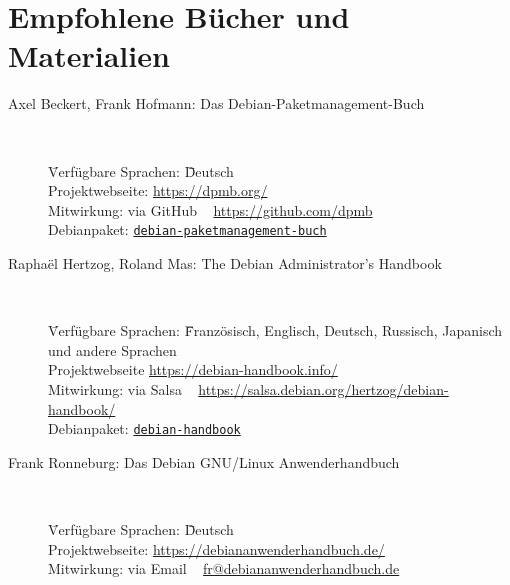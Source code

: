 \documentclass[10pt,a4paper]{article}
\begin{document}
\newpage

\cheatsheet

\section{Empfohlene Bücher und Materialien}

\begin{description}
    \item[Axel Beckert, Frank Hofmann: Das Debian-Paketmanagement-Buch] ~ \\
        \begin{tabbing}
            \= Verfügbare Sprachen: \= \= Deutsch \\
            \> Projektwebseite: \> \> \href{https://dpmb.org/}{https://dpmb.org/} \\
            \> Mitwirkung: \> \> via GitHub ~  \href{https://github.com/dpmb}{https://github.com/dpmb} \\
            \> Debianpaket: \> \> \href{https://packages.debian.org/stable/debian-paketmanagement-buch}{\texttt{debian-paketmanagement-buch}} \\ 
        \end{tabbing}

    \item[Raphaël Hertzog, Roland Mas: The Debian Administrator's Handbook] ~ \\ 
        \begin{tabbing}
            \= Verfügbare Sprachen: \= \= Französisch, Englisch, Deutsch, Russisch, Japanisch und andere Sprachen \\
            \> Projektwebseite \> \> \href{https://debian-handbook.info/}{https://debian-handbook.info/} \\
            \> Mitwirkung: \> \> via Salsa ~ \href{https://salsa.debian.org/hertzog/debian-handbook/}{https://salsa.debian.org/hertzog/debian-handbook/} \\
            \> Debianpaket: \> \> \href{https://packages.debian.org/stable/debian-handbook}{\texttt{debian-handbook}} \\
        \end{tabbing}

    \item[Frank Ronneburg: Das Debian GNU/Linux Anwenderhandbuch] ~ \\
        \begin{tabbing}
            \= Verfügbare Sprachen: \= \= Deutsch \\
            \> Projektwebseite: \> \> \href{https://debiananwenderhandbuch.de/}{https://debiananwenderhandbuch.de/} \\
            \> Mitwirkung: \> \> via Email ~  
            \href{mailto:fr@debiananwenderhandbuch.de}{fr@debiananwenderhandbuch.de} \\
            

\end{tabbing}
\end{description}
\end{document}
